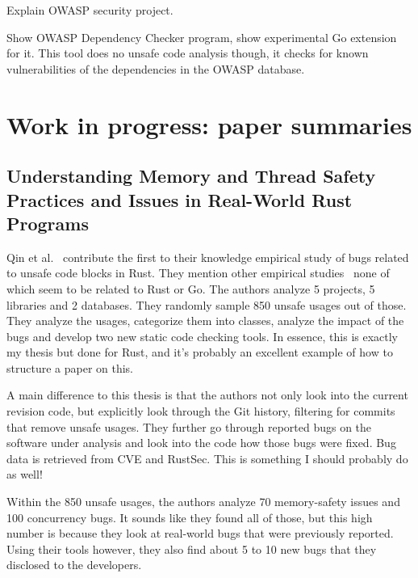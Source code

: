 Explain OWASP security project.

Show OWASP Dependency Checker program, show experimental Go extension for it.
This tool does no unsafe code analysis though, it checks for known vulnerabilities of the dependencies in the
OWASP database.



\section{Work in progress: paper summaries}\label{sec:paper-summaries}



\subsection{Understanding Memory and Thread Safety Practices and Issues in Real-World Rust Programs}
\label{subsec:understanding-memory-and-thread-safety-practices-and-issues-in-real-world-rust-programs}

Qin et al.~\cite{qin2020} contribute the first to their knowledge empirical study of bugs related to unsafe code blocks
in Rust.
They mention other empirical studies~\cite{difranco2017, lu2013, chou2001, leesatapornwongsa2016, jin2012, gunawi2014, gu2015}
none of which seem to be related to Rust or Go.
The authors analyze 5 projects, 5 libraries and 2 databases.
They randomly sample 850 unsafe usages out of those.
They analyze the usages, categorize them into classes, analyze the impact of the bugs and develop two new static code
checking tools.
In essence, this is exactly my thesis but done for Rust, and it's probably an excellent example of how to structure a
paper on this.

A main difference to this thesis is that the authors not only look into the current revision code, but explicitly look
through the Git history, filtering for commits that remove unsafe usages.
They further go through reported bugs on the software under analysis and look into the code how those bugs were fixed.
Bug data is retrieved from CVE and RustSec.
This is something I should probably do as well!

Within the 850 unsafe usages, the authors analyze 70 memory-safety issues and 100 concurrency bugs.
It sounds like they found all of those, but this high number is because they look at real-world bugs that were previously
reported.
Using their tools however, they also find about 5 to 10 new bugs that they disclosed to the developers.

